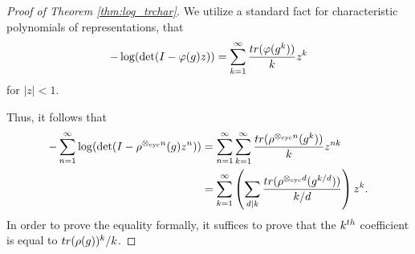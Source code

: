 \documentclass[10pt,a4paper]{amsart}
\begin{document}
\begin{proof}[Proof of Theorem \ref{thm:log_trchar}]
We utilize a standard fact for characteristic polynomials of representations, that
\[
-\log(\det(I-\varphi(g)z)) = \sum_{k=1}^{\infty} \frac{{\rm tr}(\varphi(g^k))}{k} z^k
\]
for $|z|<1$.

Thus, it follows that
\begin{align*}
-\sum_{n=1}^{\infty}\log(\det(I-\rho^{\otimes_{\text{cyc}} n}(g)z^n)) &= \sum_{n=1}^{\infty}\sum_{k=1}^{\infty} \frac{{\rm tr}(\rho^{\otimes_{\text{cyc}} n}(g^k))}{k}z^{nk}\\
&=\sum_{k=1}^{\infty}\left(\sum_{d\mid k} \frac{{\rm tr}(\rho^{\otimes_{\text{cyc}} d}(g^{k/d}))}{k/d}\right)z^k.
\end{align*}
In order to prove the equality formally, it suffices to prove that the $k^{\rm th}$ coefficient is equal to ${\rm tr}(\rho(g))^{k}/k$.


\end{proof}
\end{document}
